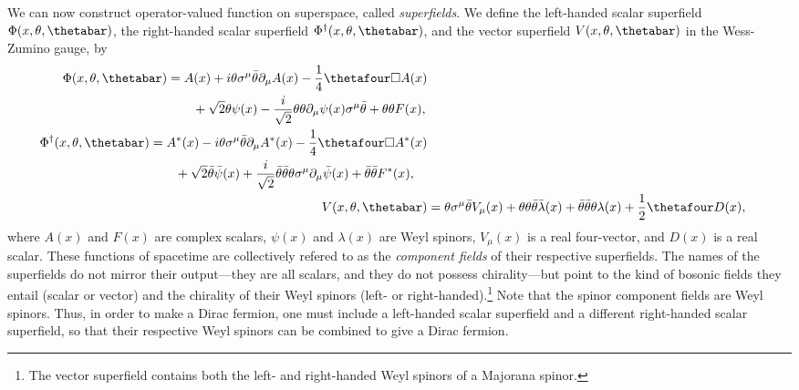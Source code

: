 We can now construct operator-valued function on superspace, called \emph{superfields}.
We define the left-handed scalar superfield $\Phi(x,\theta,\thetabar)$, the right-handed scalar superfield $\Phi^\dagger(x,\theta,\thetabar)$, and the vector superfield $V(x,\theta,\thetabar)$ in the Wess-Zumino gauge, by
\begin{subequations}
\label{eq:superfields}
\begin{align}
    \begin{split}
        \Phi(x,\theta,\thetabar) &=
        A(x)
        + i\theta\sigma^\mu\bar\theta\partial_\mu A(x)
        - \frac{1}{4}\thetafour\Box A(x)
        \\ &\qquad
        + \sqrt{2}\theta\psi(x)
        - \frac{i}{\sqrt{2}}\theta\theta\partial_\mu\psi(x)\sigma^\mu\bar\theta
        + \theta\theta F(x),
    \end{split}
    \label{eq:scalar_LH}
    \\
    \begin{split}
        \Phi^\dagger(x,\theta,\thetabar) &=
        A^*(x)
        - i\theta\sigma^\mu\bar\theta\partial_\mu A^*(x)
        - \frac{1}{4}\thetafour\Box A^*(x)
        \\ &\qquad
        + \sqrt{2}\bar\theta\bar\psi(x)
        + \frac{i}{\sqrt{2}}\bar\theta\bar\theta\theta{\sigma^\mu}\partial_\mu\bar\psi(x)
        + \bar\theta\bar\theta F^*(x),
    \end{split}
    \label{eq:scalar_RH}
    \\
    V(x,\theta,\thetabar) &=
    \theta\sigma^\mu\bar\theta V_\mu(x)
    + \theta\theta\bar\theta\bar\lambda(x)
    + \bar\theta\bar\theta\theta\lambda(x)
    + \frac{1}{2}\thetafour D(x),
    \label{eq:vector_WZ}
\end{align}
\end{subequations}
where $A(x)$ and $F(x)$ are complex scalars, $\psi(x)$ and $\lambda(x)$ are Weyl spinors, $V_\mu(x)$ is a real four-vector, and $D(x)$ is a real scalar. These functions of spacetime are collectively refered to as the \emph{component fields} of their respective superfields.
The names of the superfields do not mirror their output---they are all scalars, and they do not possess chirality---but point to the kind of bosonic fields they entail (scalar or vector) and the chirality of their Weyl spinors (left- or right-handed).\footnote{The vector superfield contains both the left- and right-handed Weyl spinors of a Majorana spinor.}
Note that the spinor component fields are Weyl spinors. Thus, in order to make a Dirac fermion, one must include a left-handed scalar superfield and a different right-handed scalar superfield, so that their respective Weyl spinors can be combined to give a Dirac fermion.


